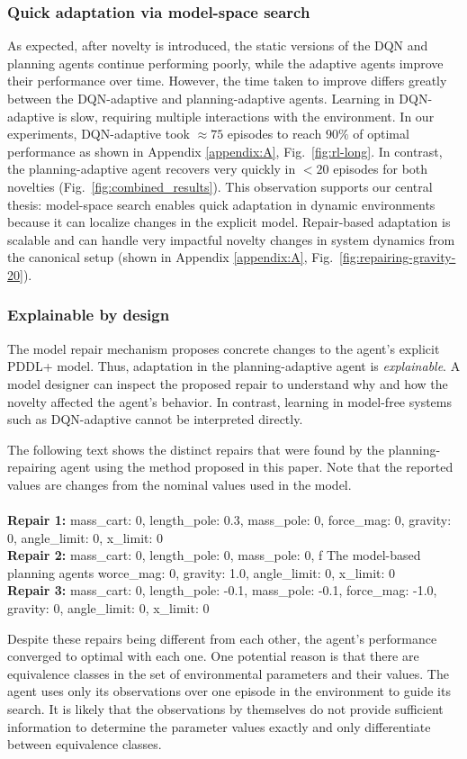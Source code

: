\documentclass[letterpaper]{article} %
\newenvironment{console}{\ttfamily}{\par}
\begin{document}
\subsubsection{Quick adaptation via model-space search} As expected, after novelty is introduced, the static versions of the DQN and planning agents continue performing poorly, while the adaptive agents improve their performance over time. However, the time taken to improve differs greatly between the DQN-adaptive and planning-adaptive agents.
Learning in DQN-adaptive is slow, requiring multiple interactions with the environment. In our experiments, DQN-adaptive took $\approx75$ episodes to reach $90\%$ of optimal performance as shown in Appendix \ref{appendix:A}, Fig.~\ref{fig:rl-long}. In contrast, the planning-adaptive agent recovers very quickly in $<20$ episodes for both novelties (Fig.~\ref{fig:combined_results}). This observation supports our central thesis: model-space search enables quick adaptation in dynamic environments because it can localize changes in the explicit model. Repair-based adaptation is scalable and can handle very impactful novelty changes in system dynamics from the canonical setup (shown in Appendix \ref{appendix:A}, Fig.~\ref{fig:repairing-gravity-20}).

\subsubsection{Explainable by design}
The model repair mechanism proposes concrete changes to the agent's explicit PDDL+ model. Thus, adaptation in the planning-adaptive agent is \emph{explainable}. A model designer can inspect the proposed repair to understand why and how the novelty affected the agent's behavior. In contrast, learning in model-free systems such as DQN-adaptive cannot be interpreted directly.

The following text shows the distinct repairs that were found by the planning-repairing agent using the method proposed in this paper. Note that the reported values are changes from the nominal values used in the model. \\
\\
\begin{console}
\textbf{Repair 1:} {mass\_cart: 0, length\_pole: 0.3, mass\_pole: 0, force\_mag: 0, gravity: 0, angle\_limit: 0, x\_limit: 0} \\
\textbf{Repair 2:} {mass\_cart: 0, length\_pole: 0, mass\_pole: 0, f
The model-based planning agents worce\_mag: 0, gravity: 1.0, angle\_limit: 0, x\_limit: 0}
\\
\textbf{Repair 3:} {mass\_cart: 0, length\_pole: -0.1, mass\_pole: -0.1, force\_mag: -1.0, gravity: 0, angle\_limit: 0, x\_limit: 0}
\end{console}
\smallskip
Despite these repairs being different from each other, the agent's performance converged to optimal with each one. One potential reason is that there are equivalence classes in the set of environmental parameters and their values. The agent uses only its observations over one episode in the environment to guide its search. It is likely that the observations by themselves do not provide sufficient information to determine the parameter values exactly and only differentiate between equivalence classes.
\end{document}
